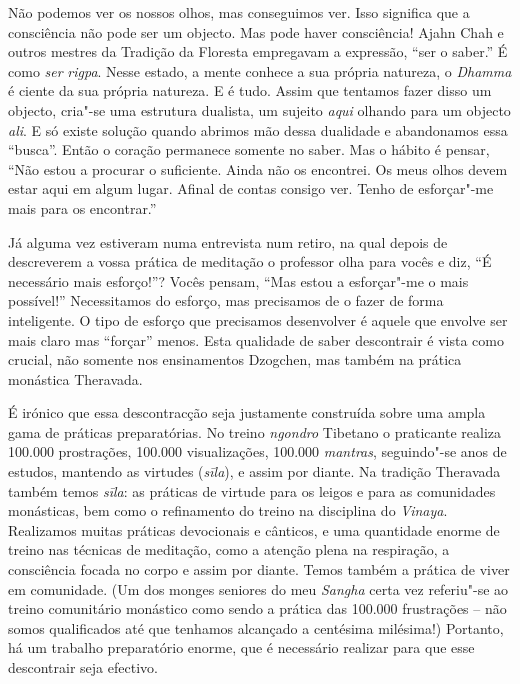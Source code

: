 Não podemos ver os nossos olhos, mas conseguimos ver. Isso significa que
a consciência não pode ser um objecto. Mas pode haver consciência! Ajahn
Chah e outros mestres da Tradição da Floresta empregavam a expressão,
``ser o saber.'' É como \emph{ser} \emph{rigpa}. Nesse estado, a mente
conhece a sua própria natureza, o \emph{Dhamma} é ciente da sua própria
natureza. E é tudo. Assim que tentamos fazer disso um objecto, cria"-se
uma estrutura dualista, um sujeito \emph{aqui} olhando para um objecto
\emph{ali}. E só existe solução quando abrimos mão dessa dualidade e
abandonamos essa ``busca''. Então o coração permanece somente no saber.
Mas o hábito é pensar, ``Não estou a procurar o suficiente. Ainda não os
encontrei. Os meus olhos devem estar aqui em algum lugar. Afinal de
contas consigo ver. Tenho de esforçar"-me mais para os encontrar.''

Já alguma vez estiveram numa entrevista num retiro, na qual depois de
descreverem a vossa prática de meditação o professor olha para vocês e
diz, ``É necessário mais esforço!''? Vocês pensam, ``Mas estou a
esforçar"-me o mais possível!'' Necessitamos do esforço, mas precisamos
de o fazer de forma inteligente. O tipo de esforço que precisamos
desenvolver é aquele que envolve ser mais claro mas ``forçar'' menos.
Esta qualidade de saber descontrair é vista como crucial, não somente
nos ensinamentos Dzogchen, mas também na prática monástica Theravada.

É irónico que essa descontracção seja justamente construída sobre uma
ampla gama de práticas preparatórias. No treino \emph{ngondro} Tibetano
o praticante realiza 100.000 prostrações, 100.000 visualizações, 100.000
\emph{mantras}, seguindo"-se anos de estudos, mantendo as virtudes
(\emph{sīla}), e assim por diante. Na tradição Theravada também
temos \emph{sīla}: as práticas de virtude para os leigos e para as
comunidades monásticas, bem como o refinamento do treino na disciplina
do \emph{Vinaya}. Realizamos muitas práticas devocionais e cânticos, e
uma quantidade enorme de treino nas técnicas de meditação, como a
atenção plena na respiração, a consciência focada no corpo e assim por
diante. Temos também a prática de viver em comunidade. (Um dos monges
seniores do meu \emph{Sangha} certa vez referiu"-se ao treino comunitário
monástico como sendo a prática das 100.000 frustrações -- não somos
qualificados até que tenhamos alcançado a centésima milésima!) Portanto,
há um trabalho preparatório enorme, que é necessário realizar para que
esse descontrair seja efectivo.

